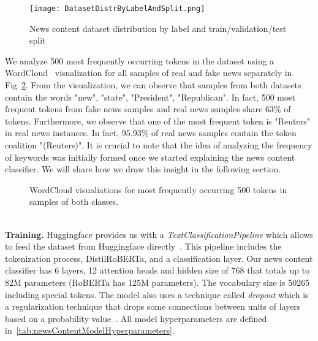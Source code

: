 \begin{figure}
    \centering
    \texttt{[image: DatasetDistrByLabelAndSplit.png]}
    \caption[News content dataset distribution by label and train/validation/test split]{News content dataset distribution by label and train/validation/test split}
    \label{fig:DatasetDistributionByLabelAndSplit}
\end{figure}
We analyze 500 most frequently occurring tokens in the dataset using a WordCloud~\parencite{WordCloud_Oesper} visualization for all samples of real and fake news separately in Fig~\ref{fig:WordCloudVisualizations}. From the visualization, we can observe that samples from both datasets contain the words "new", "state", "President", "Republican". In fact, 500 most frequent tokens from fake news samples and real news samples share 63\% of tokens. Furthermore, we observe that one of the most frequent token is "Reuters" in real news instances. In fact, 95.93\% of real news samples contain the token coalition "(Reuters)". It is crucial to note that the idea of analyzing the frequency of keywords was initially formed once we started explaining the news content classifier. We will share how we draw this insight in the following section.\\
\begin{figure}
    \centering
    \hfill
    \caption[WordCloud visualiations for most frequently occurring 500 tokens in both classes.]{WordCloud visualiations for most frequently occurring 500 tokens in samples of both classes.}
    \label{fig:WordCloudVisualizations}
\end{figure}\\
\textbf{Training.} Huggingface provides us with a \emph{TextClassificationPipeline} which allows to feed the dataset from Huggingface directly~\parencite{Transformers_Wolf}. This pipeline includes the tokenization process, DistilRoBERTa, and a classification layer. Our news content classifier has 6 layers, 12 attention heads and  hidden size of 768 that totals up to 82M parameters (RoBERTa has 125M parameters). The vocabulary size is 50265 including special tokens. The model also uses a technique called \emph{dropout} which is a regularization technique that drops some connections between units of layers based on a probability value~\parencite{Dropout_Nitish}. All model hyperparameters are defined in~\ref{tab:newsContentModelHyperparameters}.\\
